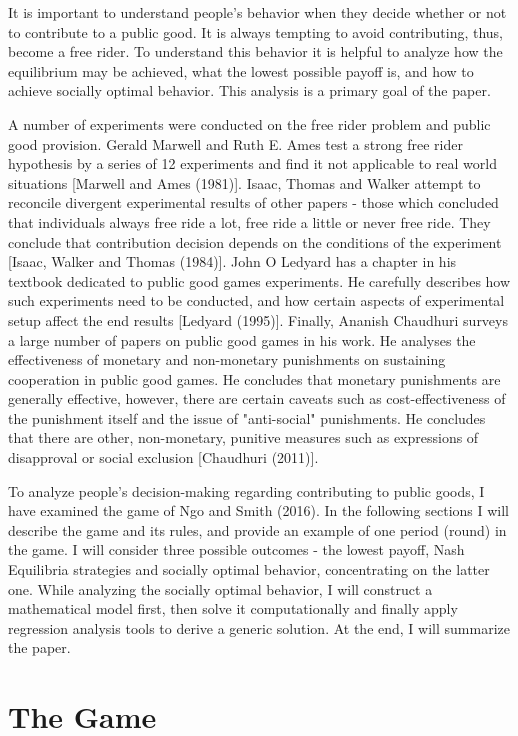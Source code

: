 	It is important to understand people's behavior when they decide whether or not to contribute to a public good. It is always tempting to avoid contributing, thus, become a free rider. To understand this behavior it is helpful to analyze how the equilibrium may be achieved, what the lowest possible payoff is, and how to achieve socially optimal behavior. This analysis is a primary goal of the paper.

	A number of experiments were conducted on the free rider problem and public good provision. Gerald Marwell and Ruth E. Ames test a strong free rider hypothesis by a series of 12 experiments and find it not applicable to real world situations [Marwell and Ames (1981)]. Isaac, Thomas and Walker attempt to reconcile divergent experimental results of other papers - those which concluded that individuals always free ride a lot, free ride a little or never free ride. They conclude that contribution decision depends on the conditions of the experiment [Isaac, Walker and Thomas (1984)]. John O Ledyard has a chapter in his textbook dedicated to public good games experiments. He carefully describes how such experiments need to be conducted, and how certain aspects of experimental setup affect the end results [Ledyard (1995)]. Finally,  Ananish Chaudhuri surveys a large number of papers on public good games in his work. He analyses the effectiveness of monetary and non-monetary punishments on sustaining cooperation in public good games. He concludes that monetary punishments are generally effective, however, there are certain caveats such as cost-effectiveness of the punishment itself and the issue of "anti-social" punishments. He concludes that there are other, non-monetary, punitive measures such as expressions of disapproval or social exclusion [Chaudhuri (2011)].

	To analyze people's decision-making regarding contributing to public goods, I have examined the game of Ngo and Smith (2016). In the following sections I will describe the game and its rules, and provide an example of one period (round) in the game. I will consider three possible outcomes - the lowest payoff, Nash Equilibria strategies and socially optimal behavior, concentrating on the latter one. While analyzing the socially optimal behavior, I will construct a mathematical model first, then solve it computationally and finally apply regression analysis tools to derive a generic solution. At the end, I will summarize the paper.

\section{The Game}

